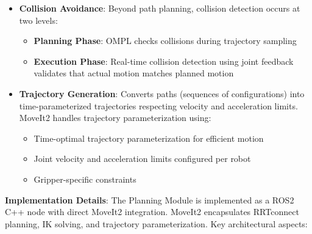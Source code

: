 \begin{itemize}
    \item \textbf{Collision Avoidance}: Beyond path planning, collision detection occurs at two levels:
    \begin{itemize}
        \item \textbf{Planning Phase}: OMPL checks collisions during trajectory sampling
        \item \textbf{Execution Phase}: Real-time collision detection using joint feedback validates that actual motion matches planned motion
    \end{itemize}
    
    \item \textbf{Trajectory Generation}: Converts paths (sequences of configurations) into time-parameterized trajectories respecting velocity and acceleration limits. MoveIt2 handles trajectory parameterization using:
    \begin{itemize}
        \item Time-optimal trajectory parameterization for efficient motion
        \item Joint velocity and acceleration limits configured per robot 
        \item Gripper-specific constraints 
    \end{itemize}
\end{itemize}

\textbf{Implementation Details}:
The Planning Module is implemented as a ROS2 C++ node with direct MoveIt2 integration. MoveIt2 encapsulates RRTconnect planning, IK solving, and trajectory parameterization. Key architectural aspects:

